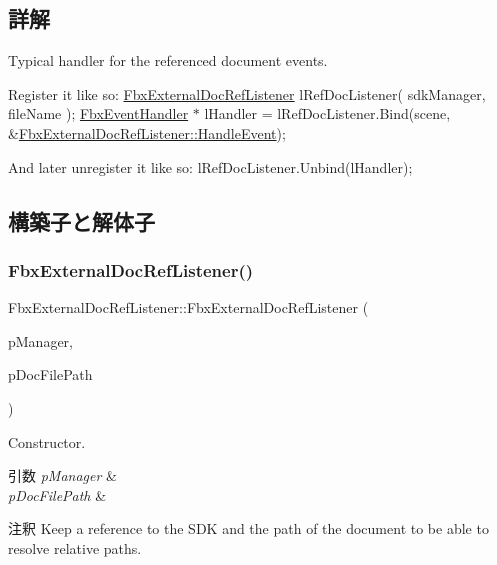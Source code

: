 \subsection{詳解}
Typical handler for the referenced document events.

Register it like so\+: \hyperlink{class_fbx_external_doc_ref_listener}{Fbx\+External\+Doc\+Ref\+Listener} l\+Ref\+Doc\+Listener( sdk\+Manager, file\+Name ); \hyperlink{class_fbx_event_handler}{Fbx\+Event\+Handler} $\ast$ l\+Handler = l\+Ref\+Doc\+Listener.\+Bind(scene, \&\hyperlink{class_fbx_external_doc_ref_listener_ab1517a34510c213bad2750763b502a88}{Fbx\+External\+Doc\+Ref\+Listener\+::\+Handle\+Event});

And later unregister it like so\+: l\+Ref\+Doc\+Listener.\+Unbind(l\+Handler); 

\subsection{構築子と解体子}
\mbox{\label{class_fbx_external_doc_ref_listener_a9118825e2ee04df01ee6117ab55fd175}} 
\subsubsection{\texorpdfstring{Fbx\+External\+Doc\+Ref\+Listener()}{FbxExternalDocRefListener()}}
{\footnotesize\ttfamily Fbx\+External\+Doc\+Ref\+Listener\+::\+Fbx\+External\+Doc\+Ref\+Listener (\begin{DoxyParamCaption}\item[{\hyperlink{class_fbx_manager}{Fbx\+Manager} \&}]{p\+Manager,  }\item[{const \hyperlink{class_fbx_string}{Fbx\+String} \&}]{p\+Doc\+File\+Path }\end{DoxyParamCaption})}

Constructor. 
\begin{DoxyParams}{引数}
{\em p\+Manager} & \\
\hline
{\em p\+Doc\+File\+Path} & \\
\hline
\end{DoxyParams}
\begin{DoxyRemark}{注釈}
Keep a reference to the S\+DK and the path of the document to be able to resolve relative paths. 
\end{DoxyRemark}
\mbox{\label{class_fbx_external_doc_ref_listener_a4145e93503fe9759dcd8a2ddd515d091}} 
